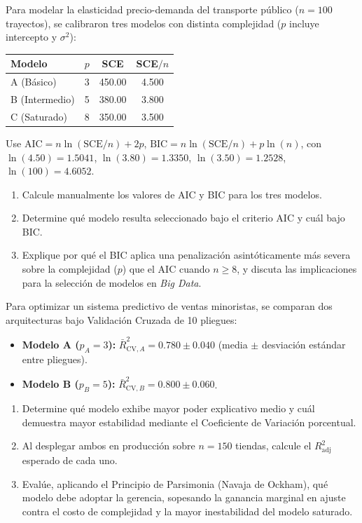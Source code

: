 \begin{problema}
	\label{prob:cb39746}
	Para modelar la elasticidad precio-demanda del transporte público ($n = 100$ trayectos), se calibraron tres modelos con distinta complejidad ($p$ incluye intercepto y $\sigma^2$):
	\begin{center}
		\begin{tabular}{|l|c|c|c|}
			\hline
			\textbf{Modelo} & \textbf{$p$} & \textbf{SCE} & \textbf{SCE$/n$} \\ \hline
			A (Básico) & 3 & 450.00 & 4.500 \\
			B (Intermedio) & 5 & 380.00 & 3.800 \\
			C (Saturado) & 8 & 350.00 & 3.500 \\ \hline
		\end{tabular}
	\end{center}
	Use $\text{AIC} = n\ln(\text{SCE}/n)+2p$, $\text{BIC} = n\ln(\text{SCE}/n)+p\ln(n)$, con $\ln(4.50)=1.5041$, $\ln(3.80)=1.3350$, $\ln(3.50)=1.2528$, $\ln(100)=4.6052$.
	\begin{enumerate}
		\item Calcule manualmente los valores de AIC y BIC para los tres modelos.
		\item Determine qué modelo resulta seleccionado bajo el criterio AIC y cuál bajo BIC.
		\item Explique por qué el BIC aplica una penalización asintóticamente más severa sobre la complejidad ($p$) que el AIC cuando $n\ge8$, y discuta las implicaciones para la selección de modelos en \emph{Big Data}.
	\end{enumerate}
\end{problema}

\begin{problema}
	\label{prob:2b2e597}
	Para optimizar un sistema predictivo de ventas minoristas, se comparan dos arquitecturas bajo Validación Cruzada de 10 pliegues:
	\begin{itemize}
		\item \textbf{Modelo A ($p_A=3$):} $\bar{R}_{\text{CV},A}^2 = 0.780 \pm 0.040$ (media $\pm$ desviación estándar entre pliegues).
		\item \textbf{Modelo B ($p_B=5$):} $\bar{R}_{\text{CV},B}^2 = 0.800 \pm 0.060$.
	\end{itemize}
	\begin{enumerate}
		\item Determine qué modelo exhibe mayor poder explicativo medio y cuál demuestra mayor estabilidad mediante el Coeficiente de Variación porcentual.
		\item Al desplegar ambos en producción sobre $n=150$ tiendas, calcule el $R_{\text{adj}}^2$ esperado de cada uno.
		\item Evalúe, aplicando el Principio de Parsimonia (Navaja de Ockham), qué modelo debe adoptar la gerencia, sopesando la ganancia marginal en ajuste contra el costo de complejidad y la mayor inestabilidad del modelo saturado.
	\end{enumerate}
\end{problema}

